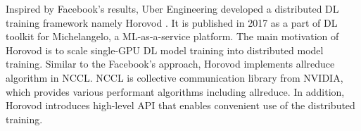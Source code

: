 Inspired by Facebook's results, Uber Engineering developed a distributed DL
training framework namely Horovod \cite{sergeev2018horovod}. It is published in
2017 as a part of DL toolkit for Michelangelo, a ML-as-a-service platform.
The main motivation of Horovod is to scale single-GPU DL model training
into distributed model training. Similar to the Facebook's approach,
Horovod implements allreduce algorithm in NCCL. NCCL is collective communication
library from NVIDIA, which provides various performant algorithms including
allreduce. In addition, Horovod introduces high-level API that enables
convenient use of the distributed training.  

